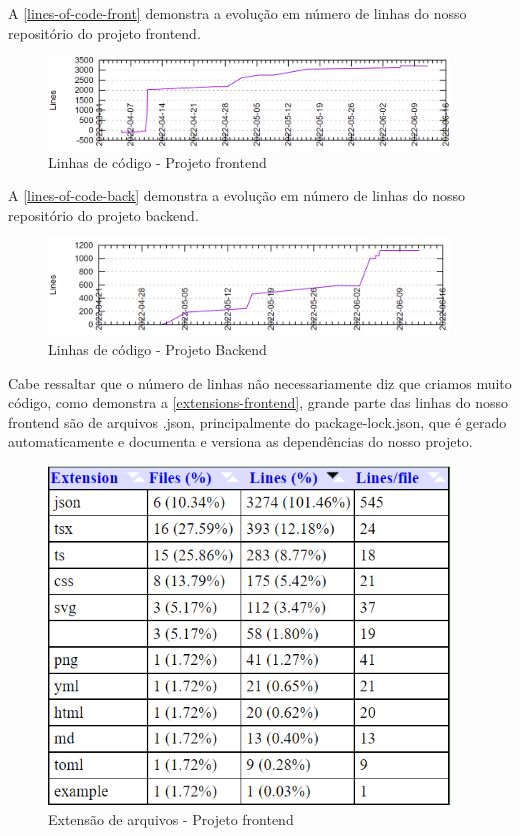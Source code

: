 A \autoref{lines-of-code-front} demonstra a evolução em número de linhas do nosso repositório do projeto \gls{frontend}.
\begin{figure}[H]
	\centering
	\caption{\label{lines-of-code-front}Linhas de código - Projeto \gls{frontend}}
	\includegraphics[width=0.95\textwidth]{../imagens/stats/lines-of-code-frontend.png}
\end{figure}

A \autoref{lines-of-code-back} demonstra a evolução em número de linhas do nosso repositório do projeto backend.
\begin{figure}[H]
	\centering
	\caption{\label{lines-of-code-back}Linhas de código - Projeto Backend}
	\includegraphics[width=0.95\textwidth]{../imagens/stats/lines-of-code-backend.png}
\end{figure}

Cabe ressaltar que o número de linhas não necessariamente diz que criamos muito código, como demonstra a \autoref{extensions-frontend}, grande parte das linhas do nosso \gls{frontend} são de arquivos .json, principalmente do package-lock.json, que é gerado automaticamente e documenta e versiona as dependências do nosso projeto.
\begin{figure}[H]
	\centering
	\caption{\label{extensions-frontend}Extensão de arquivos - Projeto \gls{frontend}}
	\includegraphics[width=0.95\textwidth]{../imagens/stats/extensions-frontend.png}
\end{figure}

